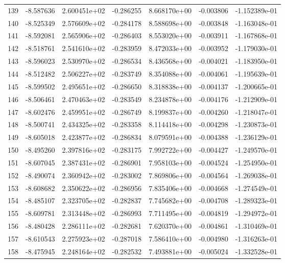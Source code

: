 \begin{tabular}{rrrrrrr}
 139 &  -8.587636 &  2.600451e+02 & -0.286255 &  8.668170e+00 &   -0.003806 & -1.152389e-01 \\
 140 &  -8.525349 &  2.576609e+02 & -0.284178 &  8.588698e+00 &   -0.003848 & -1.163048e-01 \\
 141 &  -8.592081 &  2.565906e+02 & -0.286403 &  8.553020e+00 &   -0.003911 & -1.167868e-01 \\
 142 &  -8.518761 &  2.541610e+02 & -0.283959 &  8.472033e+00 &   -0.003952 & -1.179030e-01 \\
 143 &  -8.596023 &  2.530970e+02 & -0.286534 &  8.436568e+00 &   -0.004021 & -1.183950e-01 \\
 144 &  -8.512482 &  2.506227e+02 & -0.283749 &  8.354088e+00 &   -0.004061 & -1.195639e-01 \\
 145 &  -8.599502 &  2.495651e+02 & -0.286650 &  8.318838e+00 &   -0.004137 & -1.200665e-01 \\
 146 &  -8.506461 &  2.470463e+02 & -0.283549 &  8.234878e+00 &   -0.004176 & -1.212909e-01 \\
 147 &  -8.602476 &  2.459951e+02 & -0.286749 &  8.199837e+00 &   -0.004260 & -1.218047e-01 \\
 148 &  -8.500741 &  2.434325e+02 & -0.283358 &  8.114418e+00 &   -0.004298 & -1.230873e-01 \\
 149 &  -8.605018 &  2.423877e+02 & -0.286834 &  8.079591e+00 &   -0.004388 & -1.236129e-01 \\
 150 &  -8.495260 &  2.397816e+02 & -0.283175 &  7.992722e+00 &   -0.004427 & -1.249570e-01 \\
 151 &  -8.607045 &  2.387431e+02 & -0.286901 &  7.958103e+00 &   -0.004524 & -1.254950e-01 \\
 152 &  -8.490074 &  2.360942e+02 & -0.283002 &  7.869806e+00 &   -0.004564 & -1.269038e-01 \\
 153 &  -8.608682 &  2.350622e+02 & -0.286956 &  7.835406e+00 &   -0.004668 & -1.274549e-01 \\
 154 &  -8.485107 &  2.323705e+02 & -0.282837 &  7.745682e+00 &   -0.004708 & -1.289323e-01 \\
 155 &  -8.609781 &  2.313448e+02 & -0.286993 &  7.711495e+00 &   -0.004819 & -1.294972e-01 \\
 156 &  -8.480428 &  2.286111e+02 & -0.282681 &  7.620370e+00 &   -0.004861 & -1.310469e-01 \\
 157 &  -8.610543 &  2.275923e+02 & -0.287018 &  7.586410e+00 &   -0.004980 & -1.316263e-01 \\
 158 &  -8.475945 &  2.248164e+02 & -0.282532 &  7.493881e+00 &   -0.005024 & -1.332528e-01 \\

\end{tabular}
